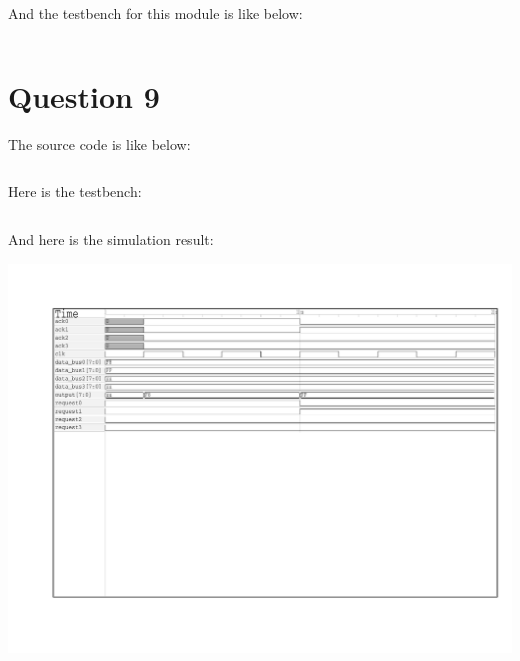 \documentclass[paper=b4, fontsize=11pt]{scrartcl} %
\numberwithin{equation}{section} %
\numberwithin{figure}{section} %
\numberwithin{table}{section} %
\begin{document}
\inputminted{vhdl}{q8/a/src/fsm.vhd}

And the testbench for this module is like below:


\inputminted{vhdl}{q8/a/test/fsm_tb.vhd}

\section{Question 9}
The source code is like below:


\inputminted{vhdl}{q9/src/arbiter.vhd}

Here is the testbench:

\inputminted{vhdl}{q9/test/arbiter_tb.vhd}


And here is the simulation result:

\includegraphics[scale=0.7]{q9/q9_wave.pdf}
\end{document}
